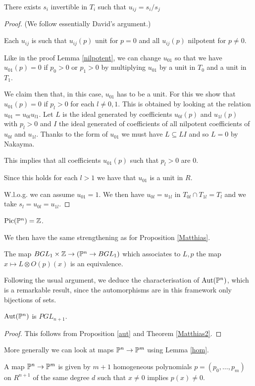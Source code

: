 \begin{proposition}
  There exists $s_i$ invertible in $T_i$ such that $u_{ij} = s_i/s_j$ 
\end{proposition}

\begin{proof}
  (We follow essentially David's argument.)

  Each $u_{ij}$ is such that $u_{ij}(p)$ unit for $p=0$ and
  all $u_{ij}(p)$ nilpotent for $p\neq 0$.

  Like in the proof Lemma \ref{nilpotent}, we can change $u_{01}$ so that
  we have $u_{01}(p) = 0$ if $p_0>0$ or $p_1>0$ by multiplying $u_{01}$ by a unit in $T_0$ and a unit in $T_1$.
  
  We claim then that, in this case, $u_{01}$ has to be a unit. For this we show that $u_{01}(p) = 0$
  if $p_l>0$ for each $l\neq 0,1$.
  This is obtained by looking at the relation $u_{01}= u_{0l}u_{l1}$. Let $L$ is the ideal generated by
  coefficients $u_{0l}(p)$ and $u_{1l}(p)$ with $p_l>0$ and $I$
  the ideal generated of coefficients of all nilpotent coefficients of $u_{0l}$ and $u_{1l}$.
  Thanks to the form of $u_{01}$ we must have $L\subseteq LI$ and so $L=0$ by Nakayma.

  This implies that all coefficients $u_{01}(p)$ such that $p_l>0$ are $0$.

  Since this holds for each $l>1$ we have that $u_{01}$ is a unit in $R$.

  W.l.o.g. we can assume $u_{01}= 1$. We then have $u_{0l} = u_{1l}$ in $T_{0l}\cap T_{1l} = T_l$
  and we take $s_l = u_{0l} = u_{1l}$.
\end{proof}

\begin{corollary}
  $\mathrm{Pic}(\mathbb{P}^n) = \mathbb{Z}$.
\end{corollary}

We then have the same strengthening as for Proposition \ref{Matthias}.

\begin{theorem}\label{Matthias2}
  The map $BGL_1\times\mathbb{Z}\rightarrow (\mathbb{P}^n\rightarrow BGL_1)$
  which associates to $L,p$ the map $x\mapsto L\otimes O(p)(x)$ is an equivalence.
\end{theorem}

Following the usual argument, we deduce the characterisation of $\mathrm{Aut}(\mathbb{P}^n)$, which is a
remarkable result, since the automorphisms are in this framework only bijections of sets.

\begin{corollary}
  $\mathrm{Aut}(\mathbb{P}^n)$ is $PGL_{n+1}$.
\end{corollary}

\begin{proof}
This follows from Proposition \ref{aut} and Theorem \ref{Matthias2}.
\end{proof}

More generally we can look at maps $\mathbb{P}^n\rightarrow\mathbb{P}^m$ using Lemma \ref{hom}.

\begin{corollary}
  A map $\mathbb{P}^n\rightarrow\mathbb{P}^m$ is given by $m+1$ homogeneous polynomials $p = (p_0,\dots,p_m)$ on $R^{n+1}$
  of the same   degree $d$ such that $x\neq 0$ implies $p(x)\neq 0$.
\end{corollary}
